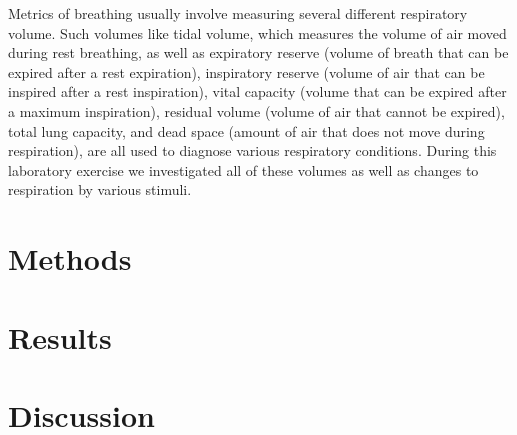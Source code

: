 \documentclass[12pt]{article}
\begin{document}
Metrics of breathing usually involve measuring several different respiratory volume. Such volumes like tidal volume, which measures the volume of air moved during rest breathing, as well as expiratory reserve (volume of breath that can be expired after a rest expiration), inspiratory reserve (volume of air that can be inspired after a rest inspiration), vital capacity (volume that can be expired after a maximum inspiration), residual volume (volume of air that cannot be expired), total lung capacity, and dead space (amount of air that does not move during respiration), are all used to diagnose various respiratory conditions. During this laboratory exercise we investigated all of these volumes as well as changes to respiration by various stimuli.

\section{Methods}



\section{Results}


\section{Discussion}


%
%
\end{document}
